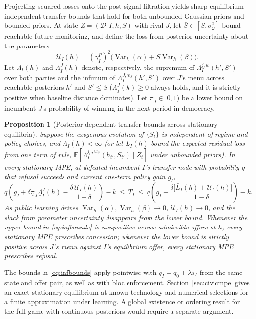 \documentclass[11pt,letterpaper]{article}
\newtheorem{proposition}{Proposition}
\newcommand{\E}{\mathbb E}
\newcommand{\Var}{\operatorname{Var}}
\begin{document}
Projecting squared losses onto the post-signal filtration yields sharp equilibrium-independent transfer bounds that hold for both unbounded Gaussian priors and bounded priors. At state $Z=(\mathcal D,I,h,S)$ with rival $J$, let $\bar S\in[S,\sigma_\omega^2]$ bound reachable future monitoring, and define the loss from posterior uncertainty about the parameters
\[
 \mathcal U_I(h)=(\gamma_I^P)^2\big(\Var_h(\alpha)+\bar S\Var_h(\beta)\big).
\]
Let $\bar\Lambda_I(h)$ and $\underline\Lambda_I^J(h)$ denote, respectively, the supremum of $\Lambda_I^{j,w}(h',S')$ over both parties and the infimum of $\Lambda_I^{J,w_J}(h',S')$ over $J$'s menu across reachable posteriors $h'$ and $S'\le\bar S$ ($\underline\Lambda_I^J(h)\ge 0$ always holds, and it is strictly positive when baseline distance dominates). Let $\underline\pi_J\in[0,1)$ be a lower bound on incumbent $J$'s probability of winning in the next period in democracy.

\begin{proposition}[Posterior-dependent transfer bounds across stationary equilibria]\label{prop:infinite}
Suppose the exogenous evolution of $\{S_t\}$ is independent of regime and policy choices, and $\bar\Lambda_I(h)<\infty$ (or let $\bar L_I(h)$ bound the expected residual loss from one term of rule, $\E[\Lambda_I^{j_{t'},w_{t'}}(h_{t'},S_{t'})\mid Z_t]$ under unbounded priors). In every stationary MPE, at defeated incumbent $I$'s transfer node with probability $q$ that refusal succeeds and current one-term policy gain $g_I$,
\begin{equation}
 q\left(g_I+\delta\underline\pi_J\underline\Lambda_I^J(h)-\frac{\delta\,\mathcal U_I(h)}{1-\delta}\right)-k
 \ \le\ T_I\ \le\
 q\left(g_I+\frac{\delta\big[\bar L_I(h)+\mathcal U_I(h)\big]}{1-\delta}\right)-k .
 \label{eq:infbounds}
\end{equation}
As public learning drives $\Var_h(\alpha),\Var_h(\beta)\to 0$, $\mathcal U_I(h)\to 0$, and the slack from parameter uncertainty disappears from the lower bound. Whenever the upper bound in \eqref{eq:infbounds} is nonpositive across admissible offers at $h$, every stationary MPE prescribes concession; whenever the lower bound is strictly positive across $J$'s menu against $I$'s equilibrium offer, every stationary MPE prescribes refusal.
\end{proposition}

The bounds in \eqref{eq:infbounds} apply pointwise with $q_I=q_0+\lambda s_I$ from the same state and offer pair, as well as with bloc enforcement. Section~\ref{sec:civicmpe} gives an exact stationary equilibrium at known technology and numerical selections for a finite approximation under learning. A global existence or ordering result for the full game with continuous posteriors would require a separate argument.
\end{document}
